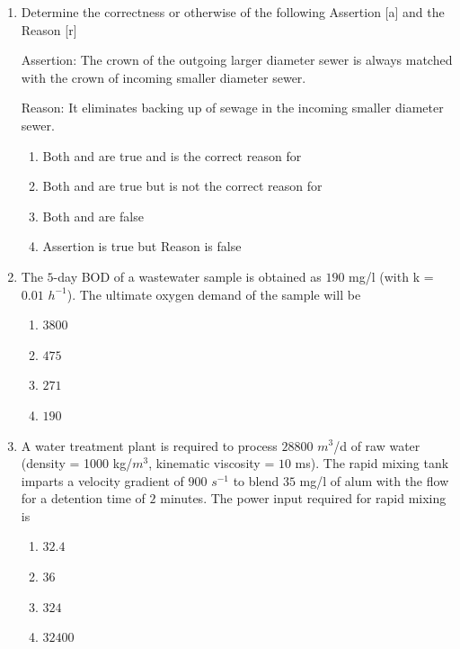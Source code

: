\documentclass[journal]{IEEEtran}
\begin{document}
\begin{enumerate}
\item Determine the correctness or otherwise of the following Assertion [a] and the Reason [r]
\vspace{0.1cm}

Assertion: The crown of the outgoing larger diameter sewer is always matched with the crown of
incoming smaller diameter sewer.
\vspace{0.1cm}

Reason: It eliminates backing up of sewage in the incoming smaller diameter sewer. \hfill {}

\begin{enumerate}
\item Both  and  are true and  is the correct reason for 
\item Both  and  are true but  is not the correct reason for 
\item Both  and  are false 
\item Assertion  is true but Reason is false 
\end{enumerate}     

\item The $5$-day BOD of a wastewater sample is obtained as $190$ mg/l (with k = $0.01$  $h^{-1}$). The ultimate oxygen demand  of the sample will be \hfill {}

\begin{enumerate}
\item $3800$
\item $475$
\item $271$
\item $190$
\end{enumerate}  

\item A water treatment plant is required to process $28800$ $m^{3}$/d of raw water (density = 1000 kg/$m^{3}$, kinematic viscosity = $10$ ms). The rapid mixing tank imparts a velocity gradient of $900$ $s^{-1}$ to blend $35$ mg/l of alum with the flow for a detention time of $2$ minutes. The power input  required for rapid mixing is \hfill {}

\begin{enumerate}
\item $32.4$
\item $36$
\item $324$
\item $32400$
\end{enumerate}  


\end{enumerate}
\end{document}
